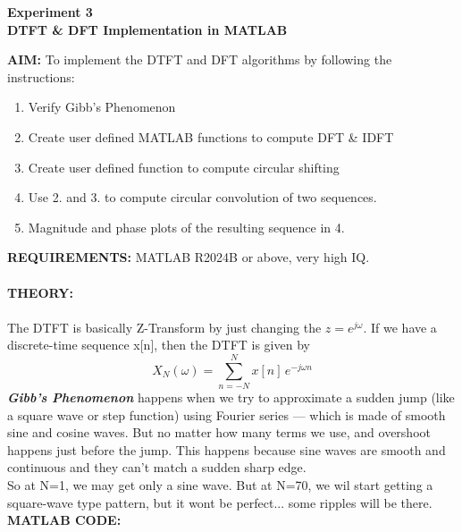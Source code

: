 \documentclass[12pt]{report}
\begin{document}
  \newpage 
  \begin{center}
    \textbf{\LARGE Experiment 3} \\
    \vspace{0.2cm}
    \textbf{\large DTFT \& DFT Implementation in MATLAB}
  \end{center}
  \textbf{AIM:} To implement the DTFT and DFT algorithms by following the instructions: 
  \begin{enumerate}
    \item Verify Gibb's Phenomenon
    \item Create user defined MATLAB functions to compute DFT \& IDFT
    \item Create user defined function to compute circular shifting 
    \item Use 2. and 3. to compute circular convolution of two sequences.
    \item Magnitude and phase plots of the resulting sequence in 4.
  \end{enumerate}

  \noindent \textbf{REQUIREMENTS:} MATLAB R2024B or above, very high IQ. \\ \\
  \textbf{THEORY:} \\ \\
  The DTFT is basically Z-Transform by just changing the  $z = e^{j \omega}$. If we have a discrete-time sequence x[n], then the DTFT is given by \cite{profnotes} \[ X_{N}(\omega) = \sum_{n = -N}^{N} x[n] \, e^{-j \omega n}  \]
  \textbf{\textit{Gibb's Phenomenon}} happens when we try to approximate a sudden jump (like a square wave or step function) using Fourier series — which is made of smooth sine and cosine waves. But no matter how many terms we use, and overshoot happens just before the jump. This happens because sine waves are smooth and continuous and they can't match a sudden sharp edge. \cite{chatgpt} \\

  So at N=1, we may get only a sine wave. But at N=70, we wil start getting a square-wave type pattern, but it wont be perfect... some ripples will be there. \\

  \noindent \textbf{MATLAB CODE:} \\
\end{document}
